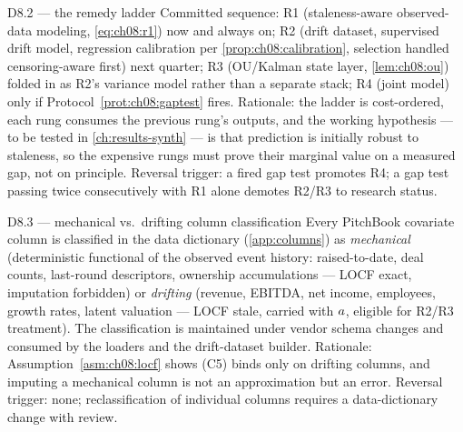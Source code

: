 \begin{decision}{D8.2 --- the remedy ladder}
Committed sequence: R1 (staleness-aware observed-data modeling,
\cref{eq:ch08:r1}) now and always on; R2 (drift dataset, supervised
drift model, regression calibration per \cref{prop:ch08:calibration},
selection handled censoring-aware first) next quarter; R3 (OU/Kalman
state layer, \cref{lem:ch08:ou}) folded in as R2's variance model rather
than a separate stack; R4 (joint model) only if
Protocol~\ref{prot:ch08:gaptest} fires. Rationale: the ladder is cost-ordered,
each rung consumes the previous rung's outputs, and the working
hypothesis --- to be tested in \cref{ch:results-synth} --- is that
prediction is initially robust to staleness, so the
expensive rungs must prove their marginal value on a measured gap, not
on principle. Reversal trigger: a fired gap test promotes R4; a gap
test passing twice consecutively with R1 alone demotes R2/R3 to
research status.
\end{decision}

\begin{decision}{D8.3 --- mechanical vs.\ drifting column classification}
Every PitchBook covariate column is classified in the data dictionary
(\cref{app:columns}) as \emph{mechanical} (deterministic functional of
the observed event history: raised-to-date, deal counts, last-round
descriptors, ownership accumulations --- LOCF exact, imputation
forbidden) or \emph{drifting} (revenue, EBITDA, net income, employees,
growth rates, latent valuation --- LOCF stale, carried with
$a$, eligible for R2/R3 treatment). The classification is
maintained under vendor schema changes and consumed by the loaders and
the drift-dataset builder. Rationale: Assumption~\ref{asm:ch08:locf} shows (C5)
binds only on drifting columns, and imputing a mechanical column is not
an approximation but an error. Reversal trigger: none; reclassification
of individual columns requires a data-dictionary change with review.
\end{decision}


